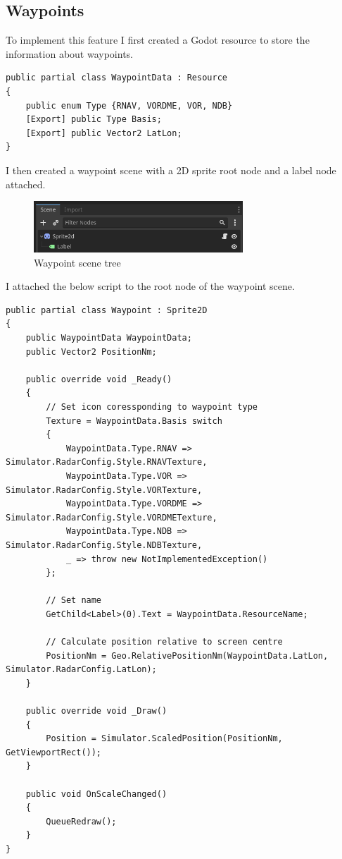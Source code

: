 \documentclass{article}
\begin{document}
\subsection{Waypoints}
To implement this feature I first created a Godot resource to store the information about waypoints.
\lstset{style=csharp}
\begin{lstlisting}[caption=Waypoint data resource]
public partial class WaypointData : Resource
{
    public enum Type {RNAV, VORDME, VOR, NDB}
    [Export] public Type Basis;
    [Export] public Vector2 LatLon;
}
\end{lstlisting}
I then created a waypoint scene with a 2D sprite root node and a label node attached.
\begin{figure}[H]
\centering
\includegraphics[width=0.7\textwidth]{screenshots/wptree.png}
\caption{\label{fig:wpscenetree}Waypoint scene tree}
\end{figure}
I attached the below script to the root node of the waypoint scene.
\lstset{style=csharp}
\begin{lstlisting}[caption=Waypoint script]
public partial class Waypoint : Sprite2D
{
    public WaypointData WaypointData;
    public Vector2 PositionNm;

    public override void _Ready()
    {
        // Set icon coressponding to waypoint type
        Texture = WaypointData.Basis switch
        {
            WaypointData.Type.RNAV => Simulator.RadarConfig.Style.RNAVTexture,
            WaypointData.Type.VOR => Simulator.RadarConfig.Style.VORTexture,
            WaypointData.Type.VORDME => Simulator.RadarConfig.Style.VORDMETexture,
            WaypointData.Type.NDB => Simulator.RadarConfig.Style.NDBTexture,
            _ => throw new NotImplementedException()
        };

        // Set name
        GetChild<Label>(0).Text = WaypointData.ResourceName;

        // Calculate position relative to screen centre
        PositionNm = Geo.RelativePositionNm(WaypointData.LatLon, Simulator.RadarConfig.LatLon);
    }

    public override void _Draw()
    {
        Position = Simulator.ScaledPosition(PositionNm, GetViewportRect());
    }

    public void OnScaleChanged()
    {
        QueueRedraw();
    }
}
\end{lstlisting}
\end{document}
